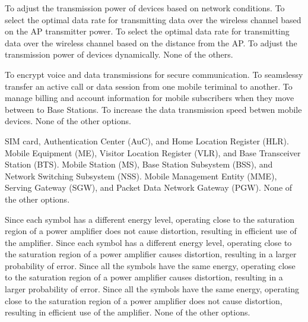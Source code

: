\begin{questions}


    \begin{checkboxes}
        \choice To adjust the transmission power of devices based on network conditions.
        \choice To select the optimal data rate for transmitting data over the wireless channel based on the AP transmitter power.
        \choice To select the optimal data rate for transmitting data over the wireless channel based on the distance from the AP.
        \choice To adjust the transmission power of devices dynamically.
        \CorrectChoice None of the others.
    \end{checkboxes}

    \begin{checkboxes}
        \choice To encrypt voice and data transmissions for secure communication.
        \choice To seamslessy transfer an active call or data session from one mobile teriminal to another.
        \choice To manage billing and account information for mobile subscribers when they move between to Base Stations.
        \choice To increase the data transmission speed betwen mobile devices.
        \CorrectChoice None of the other options.
    \end{checkboxes}

    \begin{checkboxes}
        \CorrectChoice SIM card, Authentication Center (AuC), and Home Location Register (HLR).
        \choice Mobile Equipment (ME), Visitor Location Register (VLR), and Base Transceiver Station (BTS).
        \choice Mobile Station (MS), Base Station Subsystem (BSS), and Network Switching Subsystem (NSS).
        \choice Mobile Management Entity (MME), Serving Gateway (SGW), and Packet Data Network Gateway (PGW).
        \choice None of the other options.
    \end{checkboxes}

    \begin{checkboxes}
        \choice Since each symbol has a different energy level, operating close to the saturation region of a power amplifier does not cause distortion, resulting in efficient use of the amplifier.
        \choice Since each symbol has a different energy level, operating close to the saturation region of a power amplifier causes distortion, resulting in a larger probability of error.
        \choice Since all the symbols have the same energy, operating close to the saturation region of a power amplifier causes distortion, resulting in a larger probability of error.
        \CorrectChoice Since all the symbols have the same energy, operating close to the saturation region of a power amplifier does not cause distortion, resulting in efficient use of the amplifier.
        \choice None of the other options.
    \end{checkboxes}



\end{questions}
